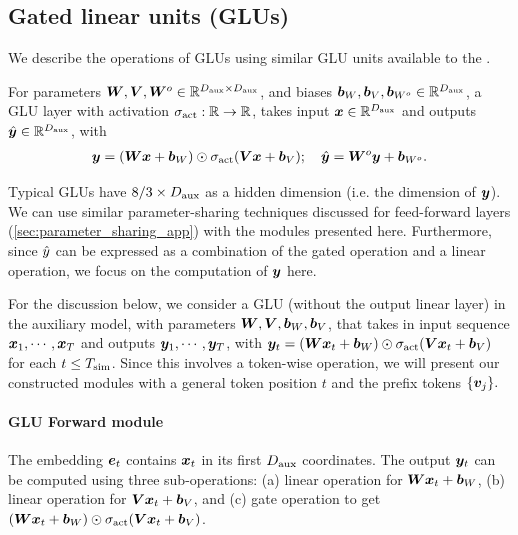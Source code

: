 \subsection{Gated linear units (GLUs)}
We describe the operations of GLUs \cite{shazeer2020glu} using similar GLU units available to the \simulator.

\begin{definition}\label{def:GLU_forward}
    For parameters ${\bm{W}}, {\bm{V}}, {\bm{W}}^o \in \mathbb{R}^{ D_{\text{aux}} \times D_{\text{aux}} }$, and biases ${\bm{b}}_W, {\bm{b}}_V, {\bm{b}}_{W^o} \in \mathbb{R}^{ D_{\text{aux}} }$, a GLU layer with activation $\sigma_{\textrm{act}}: \mathbb{R} \to \mathbb{R}$, takes input ${\bm{x}} \in \mathbb{R}^{D_{\text{aux}}}$ and outputs $\Hat{{\bm{y}}} \in \mathbb{R}^{D_{\text{aux}}}$, with
    \begin{align*}
        {\bm{y}} = ({\bm{W}} {\bm{x}} + {\bm{b}}_W) \odot \sigma_{\textrm{act}} ( {\bm{V}} {\bm{x}} + {\bm{b}}_V ); \quad
        \Hat{{\bm{y}}} = {\bm{W}}^o {\bm{y}} + {\bm{b}}_{W^o}.
    \end{align*}
\end{definition}

Typical GLUs have $8/3 \times D_{\text{aux}}$ as a hidden dimension (i.e. the dimension of ${\bm{y}}$). We can use similar parameter-sharing techniques discussed for feed-forward layers (\cref{sec:parameter_sharing_app}) with the \simulator{} modules presented here. Furthermore, since $\Hat{y}$ can be expressed as a combination of the gated operation and a linear operation, we focus on the computation of ${\bm{y}}$ here.


For the discussion below, we consider a GLU (without the output linear layer) in the auxiliary model,   with parameters ${\bm{W}}, {\bm{V}},  {\bm{b}}_W, {\bm{b}}_V$, that takes in input sequence ${\bm{x}}_1, \cdots, {\bm{x}}_T$ and outputs ${\bm{y}}_1, \cdots, {\bm{y}}_T$, with ${\bm{y}}_t = ({\bm{W}} {\bm{x}}_t + {\bm{b}}_W) \odot \sigma_{\textrm{act}} ( {\bm{V}} {\bm{x}}_t + {\bm{b}}_V )$ for each $t \le T_{\text{sim}}$. Since this involves a token-wise operation, we will present our constructed modules with a general token position $t$ and the prefix tokens $\{{\bm{v}}_j\}.$ 



\paragraph{\simulator{} GLU Forward module} 
The embedding $\ve_t$ contains ${\bm{x}}_t$ in its first $D_{\text{aux}}$ coordinates. The output ${\bm{y}}_t$ can be computed using three sub-operations: (a) linear operation for ${\bm{W}} {\bm{x}}_t + {\bm{b}}_W$, (b) linear operation for ${\bm{V}} {\bm{x}}_t + {\bm{b}}_V$, and (c)  
gate operation to get $({\bm{W}} {\bm{x}}_t + {\bm{b}}_W) \odot \sigma_{\textrm{act}}( {\bm{V}} {\bm{x}}_t + {\bm{b}}_V )$.

